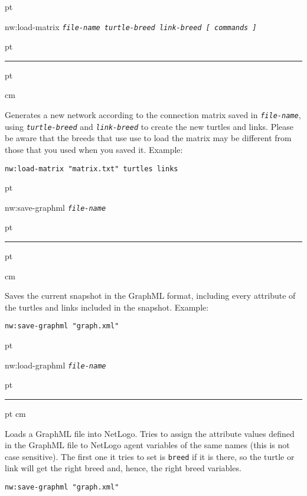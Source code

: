 \documentclass[10pt]{article}
\newenvironment{prim}{
  \vskip 6 pt
  \ttfamily
  \bfseries
}{
  \vskip 2 pt
  \hrule
  \vskip 6 pt
}
\newenvironment{doc}{
  \leftskip 0.5 cm
}
{}
\newcommand{\param}[1]{\texttt{\textit{\textmd{#1}}}}
\begin{document}
\begin{prim}
nw:load-matrix \param{file-name turtle-breed link-breed [ commands ]}
\end{prim}

\begin{doc}
Generates a new network according to the connection matrix saved in
\param{file-name}, using \param{turtle-breed} and \param{link-breed} to create
the new turtles and links. Please be aware that the breeds that use use to load the matrix may
be different from those that you used when you saved it. Example:

\begin{Verbatim}
nw:load-matrix "matrix.txt" turtles links
\end{Verbatim}
\end{doc}

\begin{prim}
nw:save-graphml \param{file-name}
\end{prim}

\begin{doc}
Saves the current snapshot in the GraphML format, including every attribute of
the turtles and links included in the snapshot. Example:
\begin{Verbatim}
nw:save-graphml "graph.xml"
\end{Verbatim}
\end{doc}

\begin{prim}
nw:load-graphml \param{file-name}
\end{prim}
\begin{doc}

Loads a GraphML file into NetLogo. Tries to assign the attribute values
defined in the GraphML file to NetLogo agent variables of the same names (this
is not case sensitive). The first one it tries to set is \texttt{breed} if it is
there, so the turtle or link will get the right breed and, hence, the right
breed variables.
\begin{Verbatim}
nw:save-graphml "graph.xml"
\end{Verbatim}
\end{doc}
\end{document}
